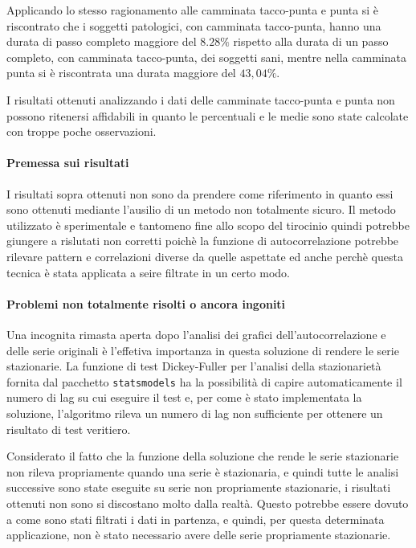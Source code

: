 Applicando lo stesso ragionamento alle camminata tacco-punta e punta si è riscontrato che 
i soggetti patologici, con camminata tacco-punta, hanno una durata di passo completo maggiore del 
$8.28\%$ rispetto alla durata di un passo completo, con camminata tacco-punta, dei soggetti sani, 
mentre nella camminata punta si è riscontrata una durata maggiore del $43,04\%$.

I risultati ottenuti analizzando i dati delle camminate tacco-punta e punta non possono ritenersi affidabili
in quanto le percentuali e le medie sono state calcolate con troppe poche osservazioni.


\paragraph*{Premessa sui risultati}
I risultati sopra ottenuti non sono da prendere come riferimento in quanto essi sono ottenuti
mediante l'ausilio di un metodo non totalmente sicuro. Il metodo utilizzato è sperimentale e tantomeno 
fine allo scopo del tirocinio quindi potrebbe giungere a rislutati non corretti 
poichè la funzione di autocorrelazione potrebbe rilevare pattern e correlazioni diverse da quelle
aspettate ed anche perchè questa tecnica è stata applicata a seire filtrate in un certo modo.

\paragraph*{Problemi non totalmente risolti o ancora ingoniti}
Una incognita rimasta aperta dopo l'analisi dei grafici dell'autocorrelazione e delle serie originali
è l'effetiva importanza in questa soluzione di rendere le serie stazionarie. 
La funzione di test Dickey-Fuller per l'analisi della stazionarietà fornita dal 
pacchetto \texttt{statsmodels} ha la possibilità
di capire automaticamente il numero di lag su cui eseguire il test e, per come è stato implementata
la soluzione, l'algoritmo rileva un numero di lag non sufficiente per ottenere un risultato 
di test veritiero.

Considerato il fatto che la funzione della soluzione che rende le serie stazionarie non 
rileva propriamente quando una serie è stazionaria, e quindi tutte le analisi successive
sono state eseguite su serie non propriamente stazionarie, i risultati ottenuti non sono
si discostano molto dalla realtà. Questo potrebbe essere dovuto a come sono stati
filtrati i dati in partenza, e quindi, per questa determinata applicazione, non è stato necessario 
avere delle serie propriamente stazionarie.



